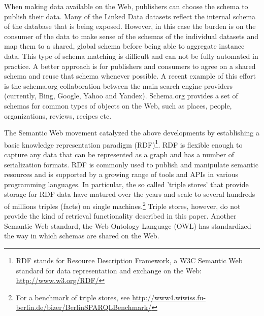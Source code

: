 When making data available on the Web, publishers can choose the schema to publish their data. Many of the Linked Data datasets reflect the internal schema of the database that is being exposed. However, in this case the burden is on the consumer of the data to make sense of the schemas of the individual datasets and map them to a shared, global schema before being able to aggregate instance data. This type of schema matching is difficult and can not be fully automated in practice. A better approach is for publishers and consumers to agree on a shared schema and reuse that schema whenever possible. A recent example of this effort is the schema.org collaboration between the main search engine providers (currently, Bing, Google, Yahoo and Yandex). Schema.org provides a set of schemas for common types of objects on the Web, such as places, people, organizations, reviews, recipes etc.

The Semantic Web movement catalyzed the above developments by establishing a basic knowledge representation paradigm (RDF)\footnote{RDF stands for Resource Description Framework, a W3C Semantic Web standard for data representation and exchange on the Web: \url{http://www.w3.org/RDF/}}. RDF is flexible enough to capture any data that can be represented as a graph and has a number of serialization formats. RDF is commonly used to publish and manipulate semantic resources and is supported by a growing range of tools and APIs in various programming languages. In particular, the so called 'triple stores' that provide storage for RDF data have matured over the years and scale to several hundreds of millions triples (facts) on single machines.\footnote{For a benchmark of triple stores, see \url{http://www4.wiwiss.fu-berlin.de/bizer/BerlinSPARQLBenchmark/}} Triple stores, however, do not provide the kind of retrieval functionality described in this paper. Another Semantic Web standard, the Web Ontology Language (OWL) has standardized the way in which schemas are shared on the Web.


